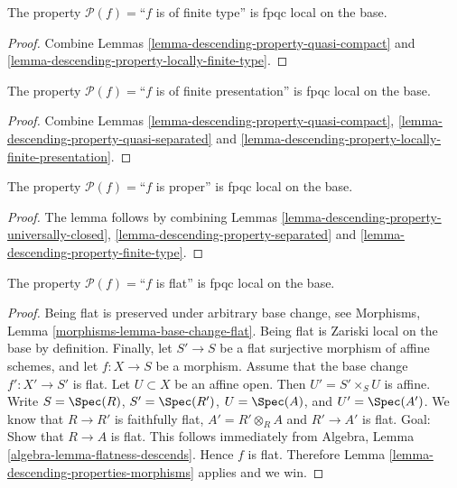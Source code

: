 \begin{lemma}
\label{lemma-descending-property-finite-type}
The property $\mathcal{P}(f) =$``$f$ is of finite type''
is fpqc local on the base.
\end{lemma}

\begin{proof}
Combine Lemmas \ref{lemma-descending-property-quasi-compact}
and \ref{lemma-descending-property-locally-finite-type}.
\end{proof}

\begin{lemma}
\label{lemma-descending-property-finite-presentation}
The property $\mathcal{P}(f) =$``$f$ is of finite presentation''
is fpqc local on the base.
\end{lemma}

\begin{proof}
Combine Lemmas \ref{lemma-descending-property-quasi-compact},
\ref{lemma-descending-property-quasi-separated} and
\ref{lemma-descending-property-locally-finite-presentation}.
\end{proof}

\begin{lemma}
\label{lemma-descending-property-proper}
The property $\mathcal{P}(f) =$``$f$ is proper''
is fpqc local on the base.
\end{lemma}

\begin{proof}
The lemma follows by combining
Lemmas \ref{lemma-descending-property-universally-closed},
\ref{lemma-descending-property-separated}
and \ref{lemma-descending-property-finite-type}.
\end{proof}

\begin{lemma}
\label{lemma-descending-property-flat}
The property $\mathcal{P}(f) =$``$f$ is flat''
is fpqc local on the base.
\end{lemma}

\begin{proof}
Being flat is preserved under arbitrary base change, see
Morphisms, Lemma \ref{morphisms-lemma-base-change-flat}.
Being flat is Zariski local on the base by definition.
Finally, let
$S' \to S$ be a flat surjective morphism of affine schemes,
and let $f : X \to S$ be a morphism. Assume that the base change
$f' : X' \to S'$ is flat.
Let $U \subset X$ be an affine open. Then $U' = S' \times_S U$
is affine. Write
$S = \Spec(R)$,
$S' = \Spec(R')$,
$U = \Spec(A)$, and
$U' = \Spec(A')$.
We know that $R \to R'$ is faithfully flat,
$A' = R' \otimes_R A$ and $R' \to A'$ is flat.
Goal: Show that $R \to A$ is flat.
This follows immediately from
Algebra, Lemma \ref{algebra-lemma-flatness-descends}.
Hence $f$ is flat.
Therefore Lemma \ref{lemma-descending-properties-morphisms} applies and we win.
\end{proof}

